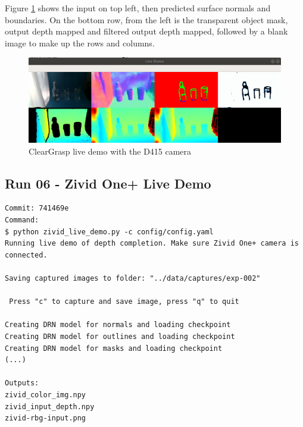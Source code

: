 Figure \ref{fig:ClearGraspLiveDemoForReport} shows the input on top left, then predicted surface normals and boundaries. On the bottom row, from the left is the transparent object mask, output depth mapped and filtered output depth mapped, followed by a blank image to make up the rows and columns.

\begin{figure}[h!]
\centering
\includegraphics[width=\textwidth]{Figures/ClearGraspLiveDemoForReport.png}
\caption{ClearGrasp live demo with the D415 camera}
\label{fig:ClearGraspLiveDemoForReport}
\end{figure}


\subsection{Run 06 - Zivid One+ Live Demo}
\label{app_res:06}

\begin{verbatim}
Commit: 741469e
Command:
$ python zivid_live_demo.py -c config/config.yaml
Running live demo of depth completion. Make sure Zivid One+ camera is connected.

Saving captured images to folder: "../data/captures/exp-002"

 Press "c" to capture and save image, press "q" to quit

Creating DRN model for normals and loading checkpoint
Creating DRN model for outlines and loading checkpoint
Creating DRN model for masks and loading checkpoint
(...)

Outputs:
zivid_color_img.npy
zivid_input_depth.npy
zivid-rbg-input.png

\end{verbatim}


